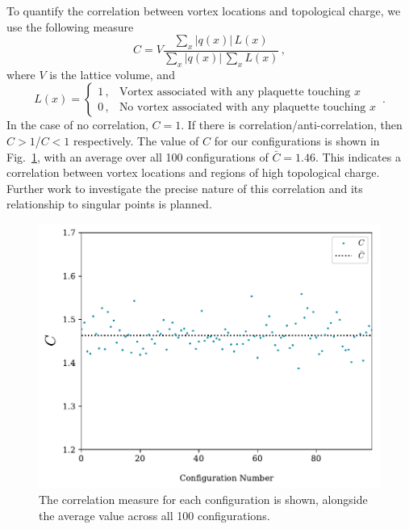 To quantify the correlation between vortex locations and topological charge, we use the following measure
%
\begin{equation}
C = V\frac{\sum_x |q(x)|\,L(x)}{\sum_x |q(x)|\,\sum_x L(x)}\, ,
\end{equation}
%
where $V$ is the lattice volume, and
%
\begin{equation}
L(x) = 
\begin{cases}
1\, , & \text{Vortex associated with any plaquette touching $x$}\\
0\, , & \text{No vortex associated with any plaquette touching $x$}
\end{cases}\, .
\end{equation}
%
In the case of no correlation, $C=1$. If there is correlation/anti-correlation, then $C>1$/$C<1$ respectively. The value of $C$ for our configurations is shown in Fig.~\ref{fig:Correlation}, with an average over all 100 configurations of $\bar{C} = 1.46$. This indicates a correlation between vortex locations and regions of high topological charge. Further work to investigate the precise nature of this correlation and its relationship to singular points is planned.\\
%
\begin{figure}
\centering
\includegraphics[width=\linewidth]{./Correlation.pdf}
\caption{\label{fig:Correlation} The correlation measure for each configuration is shown, alongside the average value across all 100 configurations.}
\end{figure}
%

